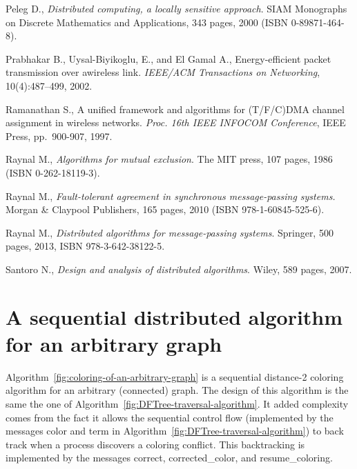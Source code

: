 \documentclass[11pt,english]{article}
\begin{document}
\begin{thebibliography}{99}
{\vspace{-0.1cm}
Peleg D.,
{\it Distributed computing, a locally sensitive approach}.
 SIAM Monographs on Discrete Mathematics and Applications, 
343 pages, 2000 (ISBN  0-89871-464-8). 

\vspace{-0.1cm}
Prabhakar B., Uysal-Biyikoglu, E., and  El Gamal A.,
Energy-efficient packet transmission over awireless link.
{\it  IEEE/ACM Transactions on Networking}, 10(4):487–499,  2002.


\vspace{-0.1cm}
Ramanathan S.,
A unified framework and algorithms for (T/F/C)DMA channel assignment in 
wireless networks.
{\it Proc. 16th IEEE INFOCOM Conference}, IEEE Press, pp.~900-907, 1997.



\vspace{-0.1cm}
Raynal M., 
{\it Algorithms for mutual exclusion}. 
The MIT press, 107 pages, 1986 (ISBN 0-262-18119-3). 

\vspace{-0.1cm}
Raynal M., 
{\it Fault-tolerant agreement  in synchronous message-passing  systems.}
Morgan \& Claypool Publishers,  165  pages, 2010
(ISBN 978-1-60845-525-6). 

\vspace{-0.1cm}
Raynal M., 
{\it Distributed algorithms for message-passing systems}.
Springer, 500 pages, 2013, ISBN 978-3-642-38122-5.


\vspace{-0.1cm}
Santoro N., 
{\it Design and analysis of distributed algorithms}. 
Wiley, 589 pages, 2007. 

}
\end{thebibliography}



\appendix 
\section{A sequential distributed algorithm for an arbitrary graph}
\label{sec:seq-arbitrary-graph}

Algorithm~\ref{fig:coloring-of-an-arbitrary-graph} is a sequential 
distance-2 coloring algorithm 
for an  arbitrary (connected) graph. The design of this algorithm 
is the same the one of  Algorithm~\ref{fig:DFTree-traversal-algorithm}.
It added complexity comes from the fact it allows the sequential control flow
(implemented by the messages {\sc color} and {\sc term}
in Algorithm~\ref{fig:DFTree-traversal-algorithm})
to back track when a process discovers  a  coloring conflict.  
This backtracking is implemented by the messages  {\sc correct},
{\sc corrected\_color}, and {\sc resume\_coloring}.
\end{document}
